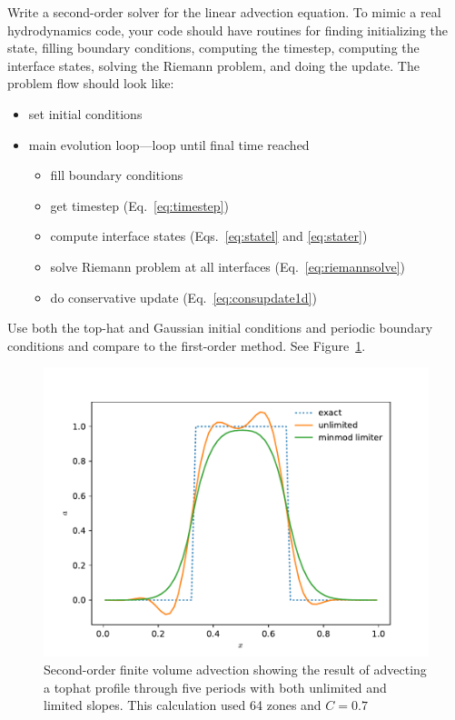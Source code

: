\begin{exercise}
{\label{adv:ex:fv} Write a second-order solver for the linear advection
  equation.  To mimic a real hydrodynamics code, your code should have
  routines for finding initializing the state, filling boundary conditions,
  computing the timestep,
  computing the interface states, solving the Riemann problem, and
  doing the update.  The problem flow should look like:
  \begin{itemize}
    \item set initial conditions
    \item main evolution loop---loop until final time reached
    \begin{itemize}
      \item fill boundary conditions
      \item get timestep (Eq.~\ref{eq:timestep})
      \item compute interface states (Eqs.~\ref{eq:statel} and \ref{eq:stater})
      \item solve Riemann problem at all interfaces (Eq.~\ref{eq:riemannsolve})
      \item do conservative update (Eq.~\ref{eq:consupdate1d})
    \end{itemize}
  \end{itemize}
Use both the top-hat and Gaussian initial conditions and periodic boundary
conditions and compare to the first-order method.  See Figure~\ref{fig:fvadvect}.
}
\end{exercise}

\begin{figure}
\centering
\includegraphics[width=0.8\linewidth]{fv-advect}
\caption[Second-order finite-volume advection]
{\label{fig:fvadvect} Second-order finite volume advection showing the
result of advecting a tophat profile through five periods with both
unlimited and limited slopes.  This calculation used 64 zones and
$C=0.7$}
\end{figure}

